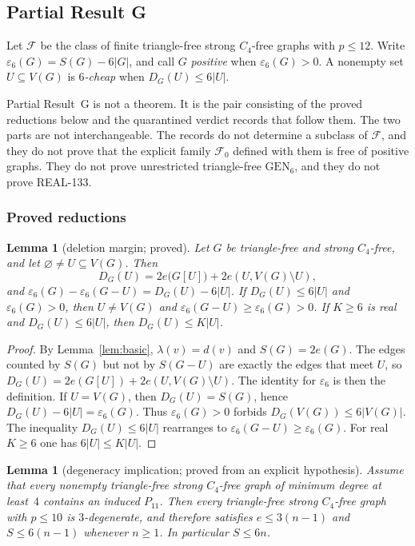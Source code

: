 \documentclass[11pt]{amsart}
\newtheorem{lemma}[theorem]{Lemma}
\theoremstyle{definition}
\theoremstyle{remark}
\newcommand{\pp}{p}
\newcommand{\GEN}{\mathrm{GEN}}
\begin{document}
\subsection*{Partial Result G}
\label{sec:partialG}
Let $\mathcal F$ be the class of finite triangle-free strong $C_4$-free graphs with $\pp\le 12$. Write $\varepsilon_6(G)=S(G)-6|G|$, and call $G$ \emph{positive} when $\varepsilon_6(G)>0$. A nonempty set $U\subseteq V(G)$ is \emph{$6$-cheap} when $D_G(U)\le 6|U|$.

Partial Result~G is not a theorem. It is the pair consisting of the proved reductions below and the quarantined verdict records that follow them. The two parts are not interchangeable. The records do not determine a subclass of $\mathcal F$, and they do not prove that the explicit family $\mathcal F_0$ defined with them is free of positive graphs. They do not prove unrestricted triangle-free $\GEN_6$, and they do not prove REAL-133.

\subsubsection*{Proved reductions}
\label{sec:Gred}

\begin{lemma}[deletion margin; proved]\label{lem:tfmargin}
Let $G$ be triangle-free and strong $C_4$-free, and let $\varnothing\ne U\subseteq V(G)$. Then
\[
D_G(U)=2e\bigl(G[U]\bigr)+2e(U,V(G)\setminus U),
\]
and $\varepsilon_6(G)-\varepsilon_6(G-U)=D_G(U)-6|U|$. If $D_G(U)\le 6|U|$ and $\varepsilon_6(G)>0$, then $U\ne V(G)$ and $\varepsilon_6(G-U)\ge\varepsilon_6(G)>0$. If $K\ge 6$ is real and $D_G(U)\le 6|U|$, then $D_G(U)\le K|U|$.
\end{lemma}

\begin{proof}
By Lemma~\ref{lem:basic}, $\lambda(v)=d(v)$ and $S(G)=2e(G)$. The edges counted by $S(G)$ but not by $S(G-U)$ are exactly the edges that meet $U$, so $D_G(U)=2e(G[U])+2e(U,V(G)\setminus U)$. The identity for $\varepsilon_6$ is then the definition. If $U=V(G)$, then $D_G(U)=S(G)$, hence $D_G(U)-6|U|=\varepsilon_6(G)$. Thus $\varepsilon_6(G)>0$ forbids $D_G(V(G))\le 6|V(G)|$. The inequality $D_G(U)\le 6|U|$ rearranges to $\varepsilon_6(G-U)\ge\varepsilon_6(G)$. For real $K\ge 6$ one has $6|U|\le K|U|$.
\end{proof}

\begin{lemma}[degeneracy implication; proved from an explicit hypothesis]\label{lem:degenerate}
Assume that every nonempty triangle-free strong $C_4$-free graph of minimum degree at least~$4$ contains an induced $P_{11}$. Then every triangle-free strong $C_4$-free graph with $\pp\le 10$ is $3$-degenerate, and therefore satisfies $e\le 3(n-1)$ and $S\le 6(n-1)$ whenever $n\ge 1$. In particular $S\le 6n$.
\end{lemma}
\end{document}
